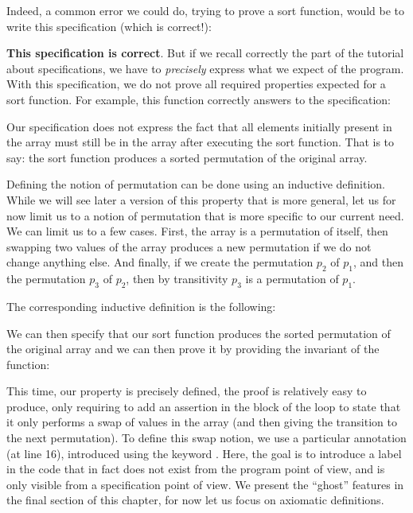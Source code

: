 Indeed, a common error we could do, trying to prove a sort function, would
be to write this specification (which is correct!):




\textbf{This specification is correct}. But if we recall correctly the part of the
tutorial about specifications, we have to \emph{precisely} express what we expect
of the program. With this specification, we do not prove all required properties
expected for a sort function. For example, this function correctly answers to
the specification:




Our specification does not express the fact that all elements initially present
in the array must still be in the array after executing the sort function. That
is to say: the sort function produces a sorted permutation of the original
array.

Defining the notion of permutation can be done using an inductive definition.
While we will see later a version of this property that is more general, let us
for now limit us to a notion of permutation that is more specific to our current
need. We can limit us to a few cases. First, the array is a permutation of
itself, then swapping two values of the array produces a new permutation if we
do not change anything else. And finally, if we create the permutation $p_2$ of
$p_1$, and then the permutation $p_3$ of $p_2$, then by transitivity $p_3$ is a
permutation of $p_1$.

The corresponding inductive definition is the following:




We can then specify that our sort function produces the sorted permutation of
the original array and we can then prove it by providing the invariant of the
function:





This time, our property is precisely defined, the proof is relatively easy to
produce, only requiring to add an assertion in the block of the loop to state
that it only performs a swap of values in the array (and then giving
the transition to the next permutation). To define this swap notion, we use
a particular annotation (at line 16), introduced using the keyword
. Here, the goal is to introduce a label in the code that in
fact does not exist from the program point of view, and is only visible from
a specification point of view. We present the ``ghost'' features in the final
section of this chapter, for now let us focus on axiomatic definitions.



